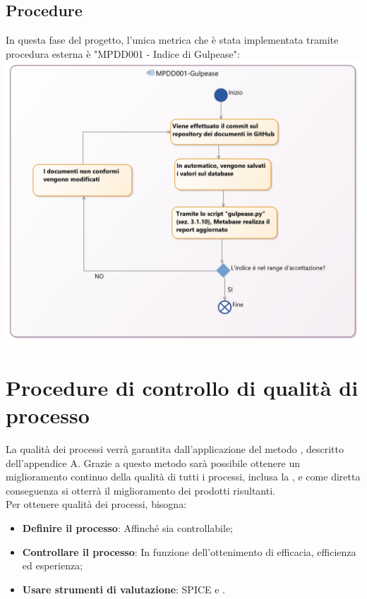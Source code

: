 \documentclass[NormeDiProgetto.tex]{subfiles}
\begin{document}
	\subsection{Procedure}
	In questa fase del progetto, l'unica metrica che è stata implementata tramite procedura esterna è "MPDD001 - Indice di Gulpease":\\
	\includegraphics[scale=0.25]{../../common/images/MetricaGulpease}
	
	
	
	\section{Procedure di controllo di qualità di processo}
	La qualità dei processi verrà garantita dall'applicazione del metodo , descritto dell'appendice A. Grazie a questo metodo sarà possibile ottenere un miglioramento continuo della qualità di tutti i processi, inclusa la , e come diretta conseguenza si otterrà il miglioramento dei prodotti risultanti.\\Per ottenere qualità dei processi, bisogna:
	\begin{itemize}
		\item \textbf{Definire il processo}: Affinché sia controllabile;
		\item \textbf{Controllare il processo}: In funzione dell'ottenimento di efficacia, efficienza ed esperienza;
		\item \textbf{Usare strumenti di valutazione}: SPICE e .
	\end{itemize}
	
\end{document}
